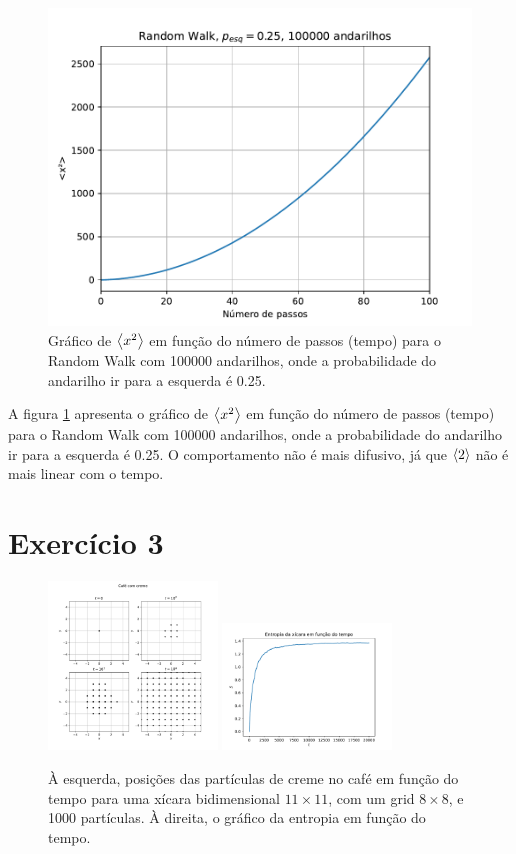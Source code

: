 \documentclass[a4paper, brazil]{article}
\begin{document}
\begin{figure}[ht]
\centering
\includegraphics[width=\textwidth]{fig_2.pdf}
\caption{Gráfico de \( \expval{x^2} \) em função do número de passos (tempo) para o Random Walk com 100000 andarilhos, onde a probabilidade do andarilho ir para a esquerda é 0.25.}\label{fig2}
\end{figure}

A figura \ref{fig2} apresenta o gráfico de \( \expval{x^2} \) em função do número de passos (tempo) para o Random Walk com 100000 andarilhos, onde a probabilidade do andarilho ir para a esquerda é 0.25.
O comportamento não é mais difusivo, já que \( \expval{2} \) não é mais linear com o tempo.

\newpage
\section{Exercício 3}

\begin{figure}[ht]
\centering
\includegraphics[width=0.4\textwidth]{fig_3a.pdf}
\includegraphics[width=0.4\textwidth]{fig_3b.pdf}
\caption{À esquerda, posições das partículas de creme no café em função do tempo para uma xícara bidimensional \( 11 \times 11 \), com um grid \( 8 \times 8 \), e 1000 partículas. À direita, o gráfico da entropia em função do tempo.}\label{fig3}
\end{figure}
\end{document}
